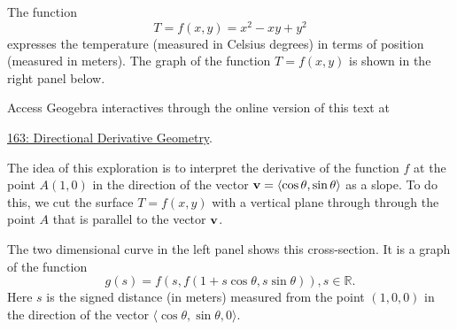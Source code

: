 \documentclass{ximera}
\begin{document}
\begin{exploration}  \label{Edf45t54t54t4}
The function
\[
     T = f(x,y) = x^2 - xy + y^2  
\]
expresses the temperature (measured in Celsius degrees) in terms of position (measured in meters). The graph of the function $T= f(x,y)$ is shown in the right panel below.



 
\begin{onlineOnly}
    \begin{center}
\end{center}
\end{onlineOnly}

Access Geogebra interactives through the online version of this text at
 
\href{https://www.geogebra.org/classic/rdezhzbs}{163: Directional Derivative Geometry}.

The idea of this exploration is to interpret the derivative of the function $f$ at the point $A(1,0)$ in the direction of the vector ${\bf v} = \langle \cos\theta, \sin\theta\rangle$ as a slope. To do this, we cut the surface $T=f(x,y)$ with a vertical plane through through the point $A$ that is parallel to the vector ${\bf v}$.

The two dimensional curve in the left panel shows this cross-section. It is a graph of the function
\[
   g(s) = f(s, f(1+s\cos \theta, s \sin\theta)) , s\in \mathbb{R}.
\]
Here $s$ is the signed distance (in meters) measured from the point $(1,0,0)$ in the direction of the vector $ \langle \cos\theta, \sin\theta , 0\rangle$.


\end{exploration}
\end{document}
